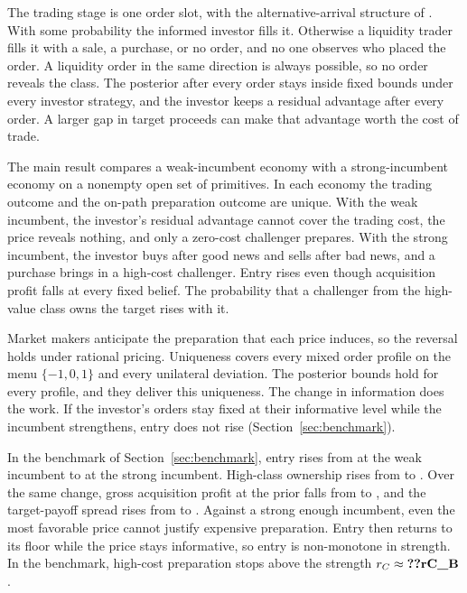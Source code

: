 The trading stage is one order slot, with the alternative-arrival structure of \citet{DowGorton1997}. With some
probability the informed investor fills it. Otherwise a liquidity trader fills it with a sale, a purchase, or no
order, and no one observes who placed the order. A liquidity order in the same direction is always possible, so no
order reveals the class. The posterior after every order stays inside fixed bounds under every investor strategy, and
the investor keeps a residual advantage after every order. A larger gap in target proceeds can make that advantage
worth the cost of trade.

The main result compares a weak-incumbent economy with a strong-incumbent economy on a nonempty open set of
primitives. In each economy the trading outcome and the on-path preparation outcome are unique. With the weak
incumbent, the investor's residual advantage cannot cover the trading cost, the price reveals nothing, and only
a zero-cost challenger prepares. With the strong incumbent, the investor buys after good news and sells after
bad news, and a purchase brings in a high-cost challenger. Entry rises even though acquisition profit falls at
every fixed belief. The probability that a challenger from the high-value class owns the target rises with it.

Market makers anticipate the preparation that each price induces, so the reversal holds under rational
pricing. Uniqueness covers every mixed order profile on the menu \(\{-1,0,1\}\) and every unilateral deviation.
The posterior bounds hold for every profile, and they deliver this uniqueness. The change in information does
the work. If the investor's orders stay fixed at their informative level while the incumbent strengthens, entry
does not rise (Section~\ref{sec:benchmark}).

In the benchmark of Section~\ref{sec:benchmark}, entry rises from  at the weak incumbent to
 at the strong incumbent. High-class ownership rises from  to .
Over the same change, gross acquisition profit at the prior falls from  to
, and the target-payoff spread rises from  to . Against a
strong enough incumbent, even the most favorable price cannot justify expensive preparation. Entry then returns
to its floor while the price stays informative, so entry is non-monotone in strength. In the benchmark,
high-cost preparation stops above the strength \(r_C\approx\reg{rC_B}\).


